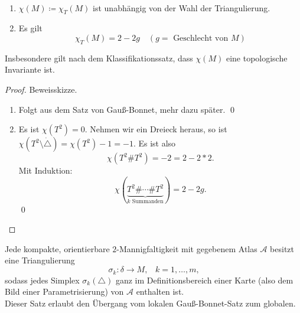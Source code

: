 \begin{theorem}
  \
  \begin{enumerate}
    \item \( \chi(M) \coloneqq \chi_T(M) \) ist unabhängig von der Wahl der Triangulierung.
    \item Es gilt
    \begin{equation*}
      \chi_T(M) = 2-2g \quad (g = \text{ Geschlecht von } M)
    \end{equation*}
  \end{enumerate}
  Insbesondere gilt nach dem Klassifikationssatz, dass \( \chi(M) \) eine topologische Invariante ist.
  \begin{proof}
    Beweisskizze.
    \begin{enumerate}
      \item Folgt aus dem Satz von Gauß-Bonnet, mehr dazu später. \qed{}
      \item Es ist \( \chi(T^2) = 0 \). Nehmen wir ein Dreieck heraus, so ist \( \chi(T^2 \setminus \dot{\triangle}) = \chi(T^2) - 1 = -1 \). Es ist also
      \begin{equation*}
        \chi(T^2 \# T^2) = -2 = 2 - 2*2\text{.}
      \end{equation*}
      Mit Induktion:
      \begin{equation*}
        \chi(\underbrace{T^2 \# \cdots \# T^2}_{k \text{ Summanden}}) = 2-2g\text{.}
      \end{equation*}
      \qed{}
    \end{enumerate}
  \end{proof}
\end{theorem}

\begin{theorem}
  Jede kompakte, orientierbare \( 2 \)-Mannigfaltigkeit mit gegebenem Atlas \( \mathcal{A} \) besitzt eine Triangulierung
  \begin{equation*}
    \sigma_k : \delta \to M\text{,} \quad k = 1,\dots,m\text{,}
  \end{equation*}
  sodass jedes Simplex \( \sigma_k(\triangle) \) ganz im Definitionsbereich einer Karte (also dem Bild einer Parametrisierung) von \( \mathcal{A} \) enthalten ist. \\
  Dieser Satz erlaubt den Übergang vom lokalen Gauß-Bonnet-Satz zum globalen.
\end{theorem}

